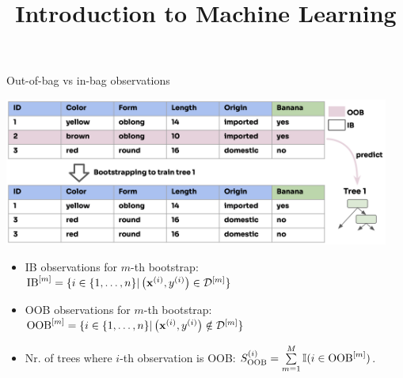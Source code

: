 \documentclass[11pt,compress,t,notes=noshow,xcolor=table]{beamer}
\title{Introduction to Machine Learning}
\begin{document}

\begin{vbframe}{Out-of-bag vs in-bag observations}

\begin{center}
\includegraphics[width=0.95\textwidth]{figure_man/forest-oob.png}
\end{center}

\vspace{-0.5em}
\begin{itemize}
\item IB observations for $m$-th bootstrap: $\mathrm{IB}^{[m]} = \{i \in \{1, \ldots, n\} | \left(\mathbf{x}^{(i)}, y^{(i)}\right) \in \mathcal{D}^{[m]}  \} $
\item OOB observations for $m$-th bootstrap: $\mathrm{OOB}^{[m]} = \{i \in \{1, \ldots, n\} | \left(\mathbf{x}^{(i)}, y^{(i)}\right) \notin \mathcal{D}^{[m]}  \} $
  \item Nr. of trees where $i$-th observation is OOB: $S_{\mathrm{OOB}}^{(i)} = \sum\limits_{m=1}^M \mathbb{I}(i \in \mathrm{OOB}^{[m]})$.
\end{itemize}

\end{vbframe}
\end{document}
